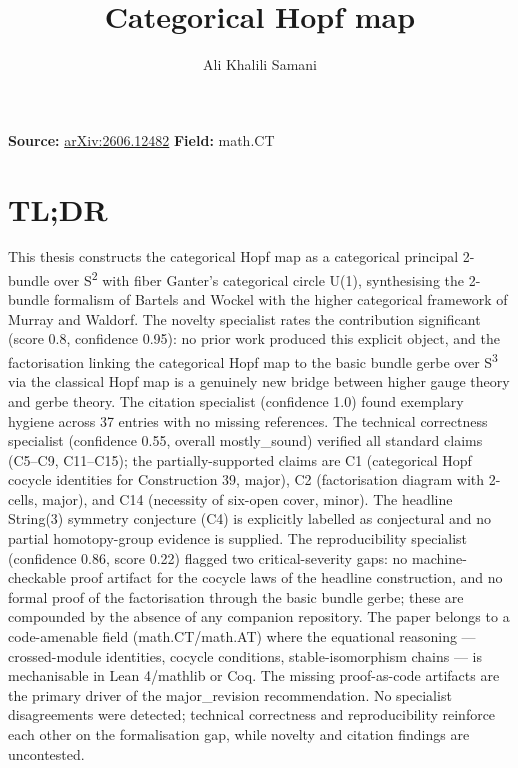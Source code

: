 \documentclass[11pt]{article}
\title{Categorical Hopf map}
\author{Ali Khalili Samani}
\date{}
\begin{document}
\maketitle

\noindent\textbf{Source:} \href{https://arxiv.org/abs/2606.12482}{arXiv:2606.12482} \quad \textbf{Field:} math.CT\\

\section*{TL;DR}
This thesis constructs the categorical Hopf map as a categorical principal 2-bundle over S\textsuperscript{2} with fiber Ganter's categorical circle U(1), synthesising the 2-bundle formalism of Bartels and Wockel with the higher categorical framework of Murray and Waldorf. The novelty specialist rates the contribution significant (score 0.8, confidence 0.95): no prior work produced this explicit object, and the factorisation linking the categorical Hopf map to the basic bundle gerbe over S\textsuperscript{3} via the classical Hopf map is a genuinely new bridge between higher gauge theory and gerbe theory. The citation specialist (confidence 1.0) found exemplary hygiene across 37 entries with no missing references. The technical correctness specialist (confidence 0.55, overall mostly\_sound) verified all standard claims (C5--C9, C11--C15); the partially-supported claims are C1 (categorical Hopf cocycle identities for Construction 39, major), C2 (factorisation diagram with 2-cells, major), and C14 (necessity of six-open cover, minor). The headline String(3) symmetry conjecture (C4) is explicitly labelled as conjectural and no partial homotopy-group evidence is supplied. The reproducibility specialist (confidence 0.86, score 0.22) flagged two critical-severity gaps: no machine-checkable proof artifact for the cocycle laws of the headline construction, and no formal proof of the factorisation through the basic bundle gerbe; these are compounded by the absence of any companion repository. The paper belongs to a code-amenable field (math.CT/math.AT) where the equational reasoning --- crossed-module identities, cocycle conditions, stable-isomorphism chains --- is mechanisable in Lean 4/mathlib or Coq. The missing proof-as-code artifacts are the primary driver of the major\_revision recommendation. No specialist disagreements were detected; technical correctness and reproducibility reinforce each other on the formalisation gap, while novelty and citation findings are uncontested.
\end{document}

